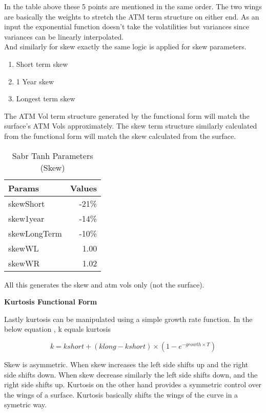 \documentclass[a4paper, 12pt]{article}
\begin{document}
In the table above these 5 points are mentioned in the same order. The two wings are basically the weights to stretch the ATM term structure on either end. As an input the exponential function doesn't take the volatilities but variances since variances can be linearly interpolated. 
\\

And similarly for skew exactly the same logic is applied for skew parameters.
\begin{enumerate}
\item Short term skew
\item 1 Year skew 
\item Longest term skew
\end{enumerate}

The ATM Vol term structure generated by the functional form will match the surface's ATM Vols approximately. The skew term structure similarly calculated from the functional form will match the skew calculated from the surface. 



\begin{table}[h]
\centering
\begin{tabular}{l|r}
Params & Values \\\hline
skewShort & -21\% \\
skew1year & -14\% \\
skewLongTerm & -10\% \\
skewWL & 1.00  \\
skewWR & 1.02 \\
\end{tabular}
\caption{\label{tab:skewtable}Sabr Tanh Parameters (Skew)}
\end{table}

All this generates the skew and atm vols only (not the surface).

\textbf{{Kurtosis Functional Form}}

Lastly kurtosis can be manipulated using a simple growth rate function. In the below equation , k equals kurtosis

\begin{equation}
k = kshort+ (klong - kshort) \times (1 - e^{-growth \times T})
\end{equation}

Skew is asymmetric. When skew increases the left side shifts up and the right side shifts down. When skew decrease similarly the left side shifts down, and the right side shifts up. Kurtosis on the other hand provides a symmetric control over the wings of a surface. Kurtosis basically shifts the wings of the curve in a symetric way. 
\end{document}
